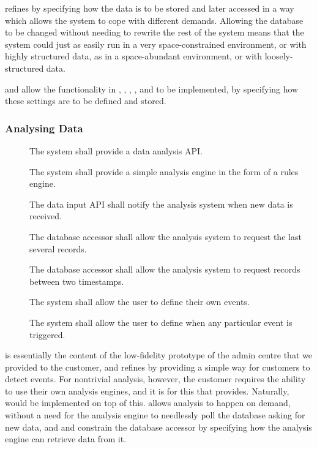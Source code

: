  refines  by specifying how the data is to be stored and
later accessed in a way which allows the system to cope with different
demands. Allowing the database to be changed without needing to
rewrite the rest of the system means that the system could just as
easily run in a very space-constrained environment, or with highly
structured data, as in a space-abundant environment, or with
loosely-structured data.

 and  allow the functionality in , ,
, , and  to be implemented, by specifying how these
settings are to be defined and stored.

\subsubsection{Analysing Data}
\label{sec:requirements-functional-analysing}

\begin{description}
 \item[] The system shall provide a data analysis API.

 \item[] The system shall provide a simple analysis engine
 in the form of a rules engine.

 \item[] The data input API shall notify the analysis
 system when new data is received.

 \item[] The database accessor shall allow the analysis
 system to request the last several records.

 \item[] The database accessor shall allow the analysis
 system to request records between two timestamps.

 \item[] The system shall allow the user to define their
 own events.

 \item[] The system shall allow the user to define when any
 particular event is triggered.
\end{description}

 is essentially the content of the low-fidelity prototype of
the admin centre that we provided to the customer, and refines 
by providing a simple way for customers to detect events. For
nontrivial analysis, however, the customer requires the ability to use
their own analysis engines, and it is for this that 
provides. Naturally,  would be implemented on top of
this.  allows analysis to happen on demand, without a need
for the analysis engine to needlessly poll the database asking for new
data, and  and  constrain the database accessor by
specifying how the analysis engine can retrieve data from it.

